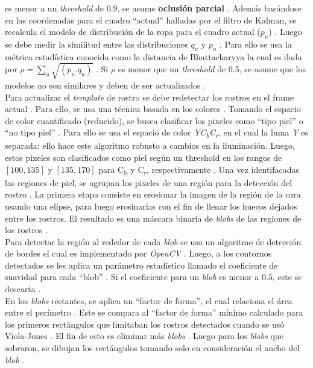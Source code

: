 \documentclass[a4paper,openright,12pt]{report}
\begin{document}
es menor a un \textit{threshold} de 0.9, se asume \textbf{oclusión parcial} \cite{shaik2007robust}.
Además basándose en las coordenadas para el cuadro ``actual'' halladas por el
filtro de Kalman, se recalcula el modelo de distribución de la ropa para el
cuadro actual ($p_{u}$) \cite{shaik2007robust}. Luego se debe medir la similitud entre las
distribuciones $q_{u}$ y $p_{u}$ \cite{shaik2007robust}. Para ello se usa la métrica estadística
conocida como la distancia de Bhattacharyya la cual es dada por
$\rho = \sum_{u}\sqrt{(p_{u}.q_{u})}$ \cite{shaik2007robust}. Si $\rho$ es menor que un
\textit{threshold} de 0.5, se asume que los modelos no son similares y deben de
ser actualizados \cite{shaik2007robust}.\\
Para actualizar el \textit{template} de rostro se debe redetectar los rostros en
el frame actual \cite{shaik2007robust}. Para ello, se usa una técnica basada en los colores \cite{shaik2007robust}. Tomando el
espacio de color cuantificado (reducido), se busca clasificar los pixeles como
``tipo piel'' o ``no tipo piel'' \cite{shaik2007robust}. Para ello se usa el espacio de color
\textit{YC\textsubscript{b}C\textsubscript{r}}, en el cual la luma \textit{Y} es
separada: ello hace este algoritmo robusto a cambios en la iluminación. Luego,
estos pixeles son clasificados como piel según un threshold en los rangos de
$[100,135]$ y $[135,170]$ para C\textsubscript{b} y C\textsubscript{r},
respectivamente \cite{shaik2007robust}. Una vez identifacadas las regiones de piel, se agrupan los
pixeles de una región para la detección del rostro \cite{shaik2007robust}. La primera etapa consiste en
erosionar la imagen de la región de la cara usando una elipse, para luego
erosinarlas con el fin de llenar los huecos dejados entre los rostros. El
resultado es una máscara binaria de \textit{blobs} de las regiones de los
rostros \cite{shaik2007robust}.\\

Para detectar la región al rededor de cada \textit{blob} se usa un algoritmo
de detección de bordes el cual es implementado por \textit{OpenCV} \cite{shaik2007robust}. Luego, a los
contornos detectados se les aplica un parámetro estadístico llamado el
coeficiente de suavidad para cada ``blob'' \cite{shaik2007robust}. Si el coeficiente para un
\textit{blob} es menor a $0.5$, este se descarta \cite{shaik2007robust}.\\

En los \textit{blobs} restantes, se aplica un ``factor de forma'', el cual
relaciona el área entre el perímetro \cite{shaik2007robust}. Este se compara al ``factor de forma''
mínimo calculado para los primeros rectángulos que limitaban los rostros
detectados cuando se usó Viola-Jones \cite{shaik2007robust}. El fin de esto es eliminar más
\textit{blobs} \cite{shaik2007robust}. Luego para los \textit{blobs} que sobraron, se dibujan los
rectángulos tomando solo en consideración el ancho del \textit{blob} \cite{shaik2007robust}.\\
\end{document}
